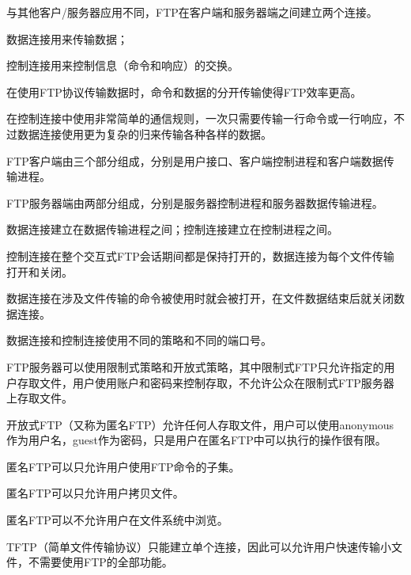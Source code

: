 与其他客户/服务器应用不同，FTP在客户端和服务器端之间建立两个连接。

\begin{compactitem}
\item 数据连接用来传输数据；
\item 控制连接用来控制信息（命令和响应）的交换。
\end{compactitem}

在使用FTP协议传输数据时，命令和数据的分开传输使得FTP效率更高。

在控制连接中使用非常简单的通信规则，一次只需要传输一行命令或一行响应，不过数据连接使用更为复杂的归来传输各种各样的数据。

FTP客户端由三个部分组成，分别是用户接口、客户端控制进程和客户端数据传输进程。

FTP服务器端由两部分组成，分别是服务器控制进程和服务器数据传输进程。



\begin{compactitem}
\item 数据连接建立在数据传输进程之间；控制连接建立在控制进程之间。
\item 控制连接在整个交互式FTP会话期间都是保持打开的，数据连接为每个文件传输打开和关闭。
\item 数据连接在涉及文件传输的命令被使用时就会被打开，在文件数据结束后就关闭数据连接。
\item 数据连接和控制连接使用不同的策略和不同的端口号。
\end{compactitem}

FTP服务器可以使用限制式策略和开放式策略，其中限制式FTP只允许指定的用户存取文件，用户使用账户和密码来控制存取，不允许公众在限制式FTP服务器上存取文件。

开放式FTP（又称为匿名FTP）允许任何人存取文件，用户可以使用anonymous作为用户名，guest作为密码，只是用户在匿名FTP中可以执行的操作很有限。

\begin{compactitem}
\item 匿名FTP可以只允许用户使用FTP命令的子集。
\item 匿名FTP可以只允许用户拷贝文件。
\item 匿名FTP可以不允许用户在文件系统中浏览。
\end{compactitem}




TFTP（简单文件传输协议）只能建立单个连接，因此可以允许用户快速传输小文件，不需要使用FTP的全部功能。








